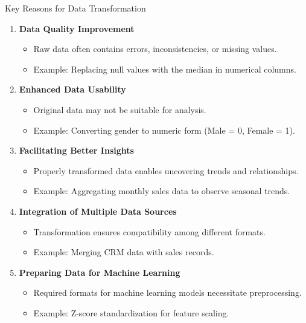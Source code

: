 \documentclass[aspectratio=169]{beamer}
\begin{document}
\begin{frame}[fragile]{Key Reasons for Data Transformation}
    \begin{enumerate}
        \item \textbf{Data Quality Improvement}
            \begin{itemize}
                \item Raw data often contains errors, inconsistencies, or missing values.
                \item Example: Replacing null values with the median in numerical columns.
            \end{itemize}

        \item \textbf{Enhanced Data Usability}
            \begin{itemize}
                \item Original data may not be suitable for analysis.
                \item Example: Converting gender to numeric form (Male = 0, Female = 1).
            \end{itemize}

        \item \textbf{Facilitating Better Insights}
            \begin{itemize}
                \item Properly transformed data enables uncovering trends and relationships.
                \item Example: Aggregating monthly sales data to observe seasonal trends.
            \end{itemize}

        \item \textbf{Integration of Multiple Data Sources}
            \begin{itemize}
                \item Transformation ensures compatibility among different formats.
                \item Example: Merging CRM data with sales records.
            \end{itemize}

        \item \textbf{Preparing Data for Machine Learning}
            \begin{itemize}
                \item Required formats for machine learning models necessitate preprocessing.
                \item Example: Z-score standardization for feature scaling.
            \end{itemize}
    \end{enumerate}
\end{frame}
\end{document}
